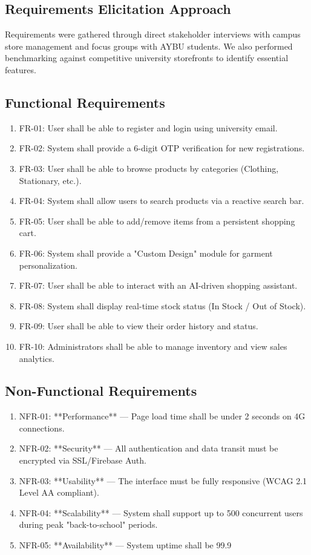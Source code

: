 \documentclass[11pt]{article}
\begin{document}
\subsection*{Requirements Elicitation Approach}
Requirements were gathered through direct stakeholder interviews with campus store management and focus groups with AYBU students. We also performed benchmarking against competitive university storefronts to identify essential features.

\subsection*{Functional Requirements}
\begin{enumerate}
    \item FR-01: User shall be able to register and login using university email.
    \item FR-02: System shall provide a 6-digit OTP verification for new registrations.
    \item FR-03: User shall be able to browse products by categories (Clothing, Stationary, etc.).
    \item FR-04: System shall allow users to search products via a reactive search bar.
    \item FR-05: User shall be able to add/remove items from a persistent shopping cart.
    \item FR-06: System shall provide a "Custom Design" module for garment personalization.
    \item FR-07: User shall be able to interact with an AI-driven shopping assistant.
    \item FR-08: System shall display real-time stock status (In Stock / Out of Stock).
    \item FR-09: User shall be able to view their order history and status.
    \item FR-10: Administrators shall be able to manage inventory and view sales analytics.
\end{enumerate}

\subsection*{Non-Functional Requirements}
\begin{enumerate}
    \item NFR-01: **Performance** --- Page load time shall be under 2 seconds on 4G connections.
    \item NFR-02: **Security** --- All authentication and data transit must be encrypted via SSL/Firebase Auth.
    \item NFR-03: **Usability** --- The interface must be fully responsive (WCAG 2.1 Level AA compliant).
    \item NFR-04: **Scalability** --- System shall support up to 500 concurrent users during peak "back-to-school" periods.
    \item NFR-05: **Availability** --- System uptime shall be 99.9%
\end{enumerate}
\end{document}
